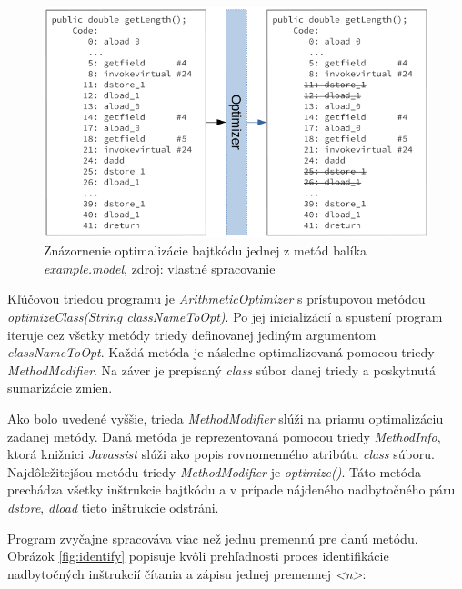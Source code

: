 \documentclass[11pt,final,oneside]{fithesis}
\begin{document}
\begin{figure}[H]
  \centering
   \includegraphics[width=\textwidth]{optimizer.png}
  \caption{Znázornenie optimalizácie bajtkódu jednej z metód balíka
  \textit{example.model}, zdroj: vlastné spracovanie}
  \label{fig:opt}
\end{figure}

Kľúčovou triedou programu je \textit{ArithmeticOptimizer} s prístupovou
metódou
\textit{optimizeClass(String classNameToOpt)}. Po jej inicializácií a spustení 
program iteruje cez všetky metódy triedy definovanej jediným argumentom 
\textit{classNameToOpt}. Každá metóda je následne optimalizovaná pomocou 
triedy \textit{MethodModifier}. Na záver je prepísaný \textit{class} súbor 
danej triedy a poskytnutá sumarizácie zmien.

Ako bolo uvedené vyššie, trieda \textit{MethodModifier} slúži na priamu 
optimalizáciu zadanej metódy. Daná metóda je reprezentovaná pomocou triedy 
\textit{MethodInfo}, ktorá knižnici \textit{Javassist} slúži ako popis 
rovnomenného atribútu \textit{class} súboru. Najdôležitejšou metódu triedy 
\textit{MethodModifier} je \textit{optimize()}. Táto metóda prechádza všetky 
inštrukcie bajtkódu a v prípade nájdeného nadbytočného páru \textit{dstore}, 
\textit{dload} tieto inštrukcie odstráni.

Program zvyčajne spracováva viac než jednu premennú pre danú metódu. Obrázok
\ref{fig:identify} popisuje kvôli prehľadnosti proces identifikácie
nadbytočných inštrukcií čítania a zápisu jednej premennej \textit{<n>}:
\end{document}
